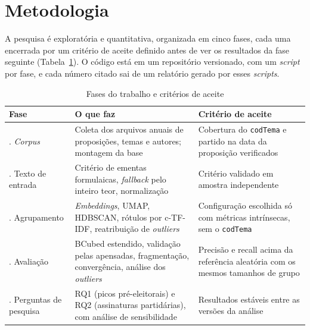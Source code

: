 
\section{Metodologia}
\label{sec:metodologia}

A pesquisa é exploratória e quantitativa, organizada em cinco fases, cada uma encerrada por um critério de aceite definido antes de ver os resultados da fase seguinte (Tabela~\ref{tab:fases}). O código está em um repositório versionado, com um \textit{script} por fase, e cada número citado sai de um relatório gerado por esses \textit{scripts}.

\begin{table}[H]
\centering
\caption{Fases do trabalho e critérios de aceite}
\label{tab:fases}
\small
\begin{tabularx}{\textwidth}{>{\raggedright\arraybackslash}p{3.2cm} >{\raggedright\arraybackslash}X >{\raggedright\arraybackslash}p{4.6cm}}
\toprule
\textbf{Fase} & \textbf{O que faz} & \textbf{Critério de aceite} \\
\midrule
1. \textit{Corpus} & Coleta dos arquivos anuais de proposições, temas e autores; montagem da base & Cobertura do \texttt{codTema} e partido na data da proposição verificados \\
\addlinespace
2. Texto de entrada & Critério de ementas formulaicas, \textit{fallback} pelo inteiro teor, normalização & Critério validado em amostra independente \\
\addlinespace
3. Agrupamento & \textit{Embeddings}, UMAP, HDBSCAN, rótulos por c-TF-IDF, reatribuição de \textit{outliers} & Configuração escolhida só com métricas intrínsecas, sem o \texttt{codTema} \\
\addlinespace
4. Avaliação & BCubed estendido, validação pelas apensadas, fragmentação, convergência, análise dos \textit{outliers} & Precisão e recall acima da referência aleatória com os mesmos tamanhos de grupo \\
\addlinespace
5. Perguntas de pesquisa & RQ1 (picos pré-eleitorais) e RQ2 (assinaturas partidárias), com análise de sensibilidade & Resultados estáveis entre as versões da análise \\
\bottomrule
\end{tabularx}
\end{table}

